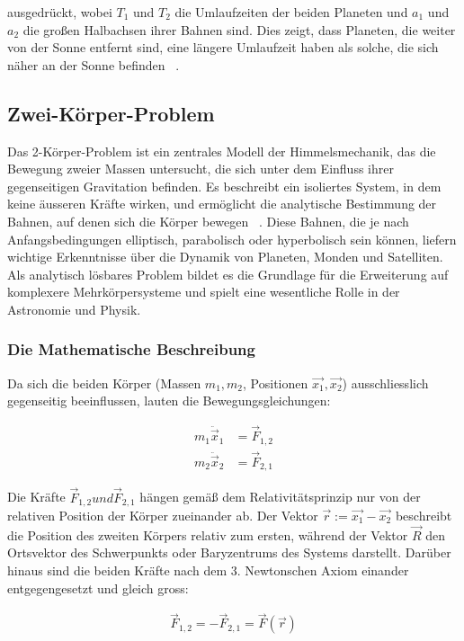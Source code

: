 \documentclass[a4paper,12pt,twoside]{article}
\begin{document}
ausgedrückt, wobei \(T_1\) und \(T_2\) die Umlaufzeiten der beiden Planeten und \(a_1\) und \(a_2\) die großen Halbachsen ihrer Bahnen sind. Dies zeigt, dass Planeten, die weiter von der Sonne entfernt sind, eine längere Umlaufzeit haben als solche, die sich näher an der Sonne befinden ~\cite{Haase1998}.


\subsection{Zwei-Körper-Problem}
Das 2-Körper-Problem ist ein zentrales Modell der Himmelsmechanik, das die Bewegung zweier Massen untersucht, die sich unter dem Einfluss ihrer gegenseitigen Gravitation befinden. Es beschreibt ein isoliertes System, in dem keine äusseren Kräfte wirken, und ermöglicht die analytische Bestimmung der Bahnen, auf denen sich die Körper bewegen  ~\cite{Spektrum}. Diese Bahnen, die je nach Anfangsbedingungen elliptisch, parabolisch oder hyperbolisch sein können, liefern wichtige Erkenntnisse über die Dynamik von Planeten, Monden und Satelliten. Als analytisch lösbares Problem bildet es die Grundlage für die Erweiterung auf komplexere Mehrkörpersysteme und spielt eine wesentliche Rolle in der Astronomie und Physik.

\subsubsection{Die Mathematische Beschreibung}

Da sich die beiden Körper (Massen \( m_1, m_2 \), Positionen \( \vec{x_1}, \vec{x_2} \)) ausschliesslich gegenseitig beeinflussen, lauten die Bewegungsgleichungen:

\begin{align*}
	m_1 \ddot{\vec{x}}_1 &= \vec{F}_{1,2} \\
	m_2 \ddot{\vec{x}}_2 &= \vec{F}_{2,1}
\end{align*}

Die Kräfte \( \vec{F}_{1,2} und \vec{F}_{2,1} \) hängen gemäß dem Relativitätsprinzip nur von der relativen Position der Körper zueinander ab. Der Vektor \( \vec{r} := \vec{x_1} - \vec{x_2} \) 
beschreibt die Position des zweiten Körpers relativ zum ersten, während der Vektor \( \vec{R} \) den Ortsvektor des Schwerpunkts oder Baryzentrums des Systems darstellt. 
Darüber hinaus sind die beiden Kräfte nach dem 3. Newtonschen Axiom einander entgegengesetzt und gleich gross:

\begin{align*}
\vec{F}_{1,2} = -\vec{F}_{2,1} = \vec{F}(\vec{r})
\end{align*}
\end{document}
